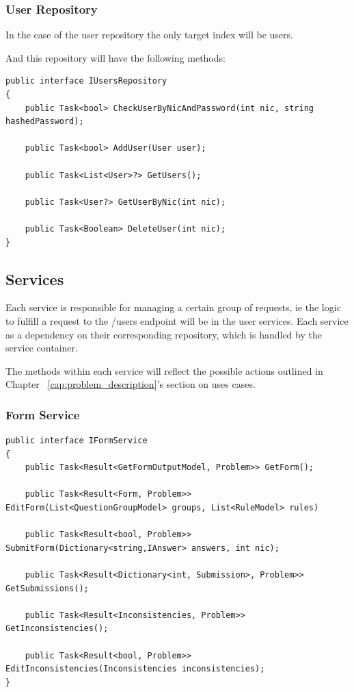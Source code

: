 \subsubsection{User Repository}

In the case of the user repository the only target index will be users.

And this repository will have the following methods:
\begin{lstlisting}[style=sharpc]
public interface IUsersRepository
{
	public Task<bool> CheckUserByNicAndPassword(int nic, string hashedPassword);
	
	public Task<bool> AddUser(User user);
	
	public Task<List<User>?> GetUsers();
	
	public Task<User?> GetUserByNic(int nic);
	
	public Task<Boolean> DeleteUser(int nic);
}
\end{lstlisting}

\subsection{Services}
Each service is responsible for managing a certain group of requests, ie the logic to fulfill a request to the /users endpoint will be in the user services. Each service as a dependency on their corresponding repository, which is handled by the service container.

The methods within each service will reflect the possible actions outlined in Chapter ~\ref{cap:problem_description}'s section on uses cases.

\subsubsection{Form Service}

\begin{lstlisting}[style=sharpc]
public interface IFormService
{
	public Task<Result<GetFormOutputModel, Problem>> GetForm();
	
	public Task<Result<Form, Problem>> EditForm(List<QuestionGroupModel> groups, List<RuleModel> rules)
	
	public Task<Result<bool, Problem>> SubmitForm(Dictionary<string,IAnswer> answers, int nic);
	
	public Task<Result<Dictionary<int, Submission>, Problem>> GetSubmissions();
	
	public Task<Result<Inconsistencies, Problem>> GetInconsistencies();
	
	public Task<Result<bool, Problem>> EditInconsistencies(Inconsistencies inconsistencies);
}
\end{lstlisting}
 

